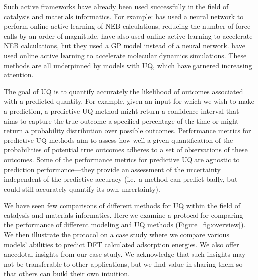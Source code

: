 \documentclass[]{achemso}
\begin{document}
Such active frameworks have already been used successfully in the field of catalysis and materials informatics.
For example: \citet{Peterson2016} has used a neural network to perform online active learning of \gls{NEB} calculations, reducing the number of force calls by an order of magnitude.
\citet{Torres2018} have also used online active learning to accelerate \gls{NEB} calculations, but they used a \gls{GP} model instead of a neural network.
\citet{Jinnouchi2019} have used online active learning to accelerate molecular dynamics simulations.
These methods are all underpinned by models with \gls{UQ}, which have garnered increasing attention.\cite{Peterson2017, Musil2019}

The goal of \gls{UQ} is to quantify accurately the likelihood of outcomes associated with a predicted quantity.
For example, given an input for which we wish to make a prediction, a predictive \gls{UQ} method might return a confidence interval that aims to capture the true outcome a specified percentage of the time or might return a probability distribution over possible outcomes.
Performance metrics for predictive \gls{UQ} methods aim to assess how well a given quantification of the probabilities of potential true outcomes adheres to a set of observations of these outcomes.
Some of the performance metrics for predictive \gls{UQ} are agnostic to prediction performance---they provide an assessment of the uncertainty independent of the predictive accuracy (i.e.\ a method can predict badly, but could still accurately quantify its own uncertainty).

We have seen few\cite{Janet2019, Scalia2019} comparisons of different methods for \gls{UQ} within the field of catalysis and materials informatics.
Here we examine a protocol\cite{Kuleshov2018, Levi2020} for comparing the performance of different modeling and \gls{UQ} methods (Figure~\ref{fig:overview}).
We then illustrate the protocol on a case study where we compare various models' abilities to predict \gls{DFT} calculated adsorption energies.
We also offer anecdotal insights from our case study.
We acknowledge that such insights may not be transferable to other applications, but we find value in sharing them so that others can build their own intuition.
\end{document}
